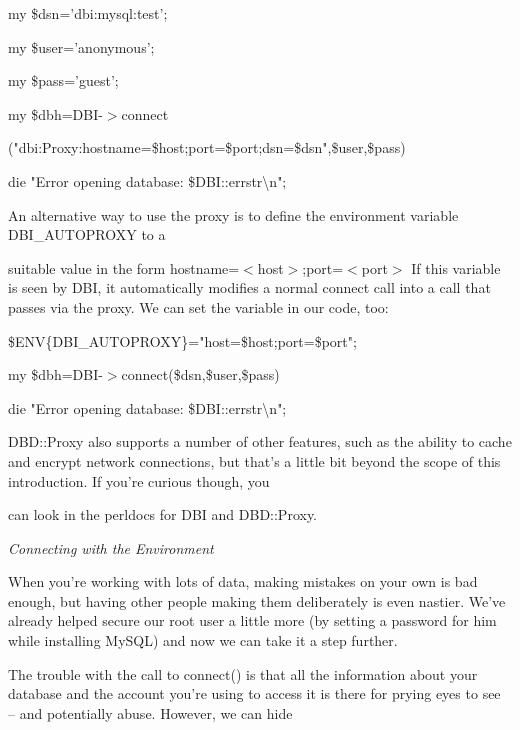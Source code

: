 \documentclass[a4paper,11pt]{book}
\begin{document}
\noindent my \$dsn='dbi:mysql:test';

\noindent my \$user='anonymous';

\noindent my \$pass='guest';

\noindent 

\noindent my \$dbh=DBI-$>$connect

\noindent ("dbi:Proxy:hostname=\$host;port=\$port;dsn=\$dsn",\$user,\$pass)

\noindent \textbar \textbar  die "Error opening database: \$DBI::errstr\textbackslash n";

\noindent 

\noindent 

\noindent An alternative way to use the proxy is to define the environment variable DBI\_AUTOPROXY to a

\noindent suitable value in the form hostname=$<$host$>$;port=$<$port$>$ If this variable is seen by DBI, it automatically modifies a normal connect call into a call that passes via the proxy. We can set the variable in our code, too:

\noindent 

\noindent \$ENV\{DBI\_AUTOPROXY\}="host=\$host;port=\$port";

\noindent my \$dbh=DBI-$>$connect(\$dsn,\$user,\$pass)

\noindent \textbar \textbar  die "Error opening database: \$DBI::errstr\textbackslash n";

\noindent 

\noindent DBD::Proxy also supports a number of other features, such as the ability to cache and encrypt network connections, but that's a little bit beyond the scope of this introduction. If you're curious though, you

\noindent can look in the perldocs for DBI and DBD::Proxy.

\noindent 

\noindent \textit{Connecting with the Environment}

\noindent When you're working with lots of data, making mistakes on your own is bad enough, but having other people making them deliberately is even nastier. We've already helped secure our root user a little more (by setting a password for him while installing MySQL) and now we can take it a step further.

\noindent 

\noindent The trouble with the call to connect() is that all the information about your database and the account you're using to access it is there for prying eyes to see -- and potentially abuse. However, we can hide
\end{document}
